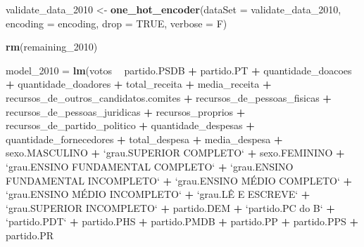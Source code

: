 \documentclass[]{article}
\newenvironment{Shaded}{\begin{snugshade}}{\end{snugshade}}
\newcommand{\KeywordTok}[1]{\textcolor[rgb]{0.13,0.29,0.53}{\textbf{#1}}}
\newcommand{\DataTypeTok}[1]{\textcolor[rgb]{0.13,0.29,0.53}{#1}}
\newcommand{\DecValTok}[1]{\textcolor[rgb]{0.00,0.00,0.81}{#1}}
\newcommand{\StringTok}[1]{\textcolor[rgb]{0.31,0.60,0.02}{#1}}
\newcommand{\OtherTok}[1]{\textcolor[rgb]{0.56,0.35,0.01}{#1}}
\newcommand{\OperatorTok}[1]{\textcolor[rgb]{0.81,0.36,0.00}{\textbf{#1}}}
\newcommand{\NormalTok}[1]{#1}
\begin{document}
\begin{Shaded}
\begin{Highlighting}[]
{{\NormalTok{validate_data_}\DecValTok{2010}\NormalTok{ <-}\StringTok{ }\KeywordTok{one_hot_encoder}\NormalTok{(}\DataTypeTok{dataSet =}\NormalTok{ validate_data_}\DecValTok{2010}\NormalTok{,}
                           \DataTypeTok{encoding =}\NormalTok{ encoding,}
                           \DataTypeTok{drop =} \OtherTok{TRUE}\NormalTok{,}
                           \DataTypeTok{verbose =}\NormalTok{ F)}

\KeywordTok{rm}\NormalTok{(remaining_}\DecValTok{2010}\NormalTok{)}

\NormalTok{model_}\DecValTok{2010}\NormalTok{ =}\StringTok{ }\KeywordTok{lm}\NormalTok{(votos }\OperatorTok{~}\StringTok{ }\NormalTok{partido.PSDB }\OperatorTok{+}\StringTok{ }\NormalTok{partido.PT }\OperatorTok{+}\StringTok{ }\NormalTok{quantidade_doacoes }\OperatorTok{+}\StringTok{ }\NormalTok{quantidade_doadores }\OperatorTok{+}\StringTok{ }\NormalTok{total_receita }\OperatorTok{+}\StringTok{ }\NormalTok{media_receita}
                \OperatorTok{+}\StringTok{ }\NormalTok{recursos_de_outros_candidatos.comites }\OperatorTok{+}\StringTok{ }\NormalTok{recursos_de_pessoas_fisicas }\OperatorTok{+}\StringTok{ }\NormalTok{recursos_de_pessoas_juridicas}
                \OperatorTok{+}\StringTok{ }\NormalTok{recursos_proprios }\OperatorTok{+}\StringTok{ }\NormalTok{recursos_de_partido_politico }\OperatorTok{+}\StringTok{ }\NormalTok{quantidade_despesas }\OperatorTok{+}\StringTok{ }\NormalTok{quantidade_fornecedores}
                \OperatorTok{+}\StringTok{ }\NormalTok{total_despesa }\OperatorTok{+}\StringTok{  }\NormalTok{media_despesa }\OperatorTok{+}\StringTok{ }\NormalTok{sexo.MASCULINO }\OperatorTok{+}\StringTok{ `}\DataTypeTok{grau.SUPERIOR COMPLETO}\StringTok{`} \OperatorTok{+}\StringTok{ }\NormalTok{sexo.FEMININO}
                \OperatorTok{+}\StringTok{ `}\DataTypeTok{grau.ENSINO FUNDAMENTAL COMPLETO}\StringTok{`} \OperatorTok{+}\StringTok{ `}\DataTypeTok{grau.ENSINO FUNDAMENTAL INCOMPLETO}\StringTok{`} \OperatorTok{+}\StringTok{ `}\DataTypeTok{grau.ENSINO MÉDIO COMPLETO}\StringTok{`}
                \OperatorTok{+}\StringTok{ `}\DataTypeTok{grau.ENSINO MÉDIO INCOMPLETO}\StringTok{`} \OperatorTok{+}\StringTok{ `}\DataTypeTok{grau.LÊ E ESCREVE}\StringTok{`} \OperatorTok{+}\StringTok{ `}\DataTypeTok{grau.SUPERIOR INCOMPLETO}\StringTok{`} \OperatorTok{+}\StringTok{ }\NormalTok{partido.DEM}
                \OperatorTok{+}\StringTok{ `}\DataTypeTok{partido.PC do B}\StringTok{`} \OperatorTok{+}\StringTok{ `}\DataTypeTok{partido.PDT}\StringTok{`} \OperatorTok{+}\StringTok{ }\NormalTok{partido.PHS }\OperatorTok{+}\StringTok{ }\NormalTok{partido.PMDB }\OperatorTok{+}\StringTok{ }\NormalTok{partido.PP }\OperatorTok{+}\StringTok{ }\NormalTok{partido.PPS }\OperatorTok{+}\StringTok{ }\NormalTok{partido.PR}
}}
\end{Highlighting}
\end{Shaded}
\end{document}
